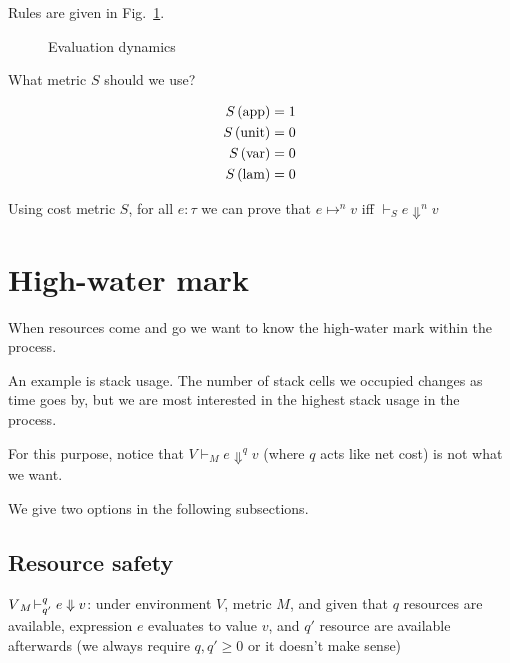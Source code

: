 \documentclass[ manuscript, review,screen, nonacm]{acmart}
\begin{document}
Rules are given in Fig.~\ref{fig:eval-sem}.
\begin{figure}[htb]
\caption{Evaluation dynamics}
\label{fig:eval-sem}
\end{figure}

What metric $S$ should we use?

\begin{align}
S\left(\mathrm{app}\right)&=1 \\
S\left(\mathrm{unit}\right) &=0 \\
S\left(\mathrm{var}\right) &=0 \\
S\left(\mathrm{lam}\right) &=0
\end{align}

Using cost metric $S$, for all $e:\tau$ we can prove that $e \mapsto^n v$ iff $\vdash _S e \Downarrow^n v$



\section{High-water mark}

When resources come and go we want to know the high-water mark within the process.

An example is stack usage. The number of stack cells we occupied changes as time goes by, but we are most interested in the highest stack usage in the process.

For this purpose, notice that $V \vdash_M e \Downarrow ^q v$ (where $q$ acts like net cost) is not what we want.

We give two options in the following subsections.

\subsection{ Resource safety}
$V {}_{M}\!\vdash^{q}_{q'} e \Downarrow v$: under environment $V$, metric $M$, and given that $q$ resources are available, expression $e$ evaluates to value $v$, and $q'$ resource are available afterwards (we always require $q,q'\geq 0$ or it doesn't make sense)
\end{document}
